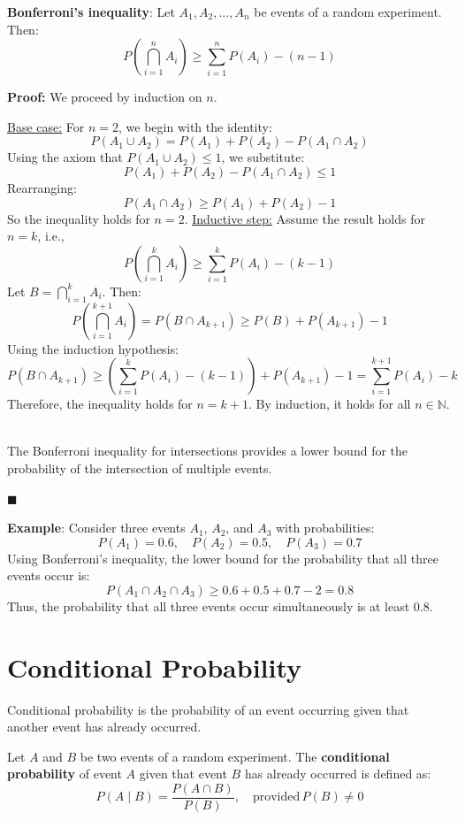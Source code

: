\documentclass[twoside]{book}
\begin{document}
\begin{textbox}
\textbf{Bonferroni's inequality}: Let \( A_1, A_2, \ldots, A_n \) be events of a random experiment. Then:
\[
P\left( \bigcap_{i=1}^n A_i \right) \geq \sum_{i=1}^n P(A_i) - (n - 1)
\]
\end{textbox}
\textbf{Proof:} We proceed by induction on \( n \).

\underline{Base case:} For \( n = 2 \),
we begin with the identity:
\[
P(A_1 \cup A_2) = P(A_1) + P(A_2) - P(A_1 \cap A_2)
\]
Using the axiom that \( P(A_1 \cup A_2) \leq 1 \), we substitute:
\[
P(A_1) + P(A_2) - P(A_1 \cap A_2) \leq 1
\]
Rearranging:
\[
 P(A_1 \cap A_2) \geq P(A_1) + P(A_2) - 1
\]
So the inequality holds for $n = 2$.
\underline{Inductive step:} Assume the result holds for \( n = k \), i.e.,
\[
P\left( \bigcap_{i=1}^{k} A_i \right) \geq \sum_{i=1}^{k} P(A_i) - (k - 1)
\]
Let \( B = \bigcap_{i=1}^{k} A_i \). Then:
\[
P\left( \bigcap_{i=1}^{k+1} A_i \right) = P(B \cap A_{k+1}) \geq P(B) + P(A_{k+1}) - 1
\]
Using the induction hypothesis:
\[
P(B \cap A_{k+1}) \geq \left( \sum_{i=1}^{k} P(A_i) - (k - 1) \right) + P(A_{k+1}) - 1 = \sum_{i=1}^{k+1} P(A_i) - k
\]
Therefore, the inequality holds for \( n = k + 1 \). By induction, it holds for all \( n \in \mathbb{N} \). \

The Bonferroni inequality for intersections provides a lower bound for the probability of the intersection of multiple events.

\hfill\(\blacksquare\)

\textbf{Example}: Consider three events \( A_1 \), \( A_2 \), and \( A_3 \) with probabilities:
\[
P(A_1) = 0.6, \quad P(A_2) = 0.5, \quad P(A_3) = 0.7
\]
Using Bonferroni’s inequality, the lower bound for the probability that all three events occur is:
\[
P(A_1 \cap A_2 \cap A_3) \geq 0.6 + 0.5 + 0.7 - 2 = 0.8
\]
Thus, the probability that all three events occur simultaneously is at least \( 0.8 \).

\section{Conditional Probability}

Conditional probability is the probability of an event occurring given that another event has already occurred.

\begin{textbox}
    Let $A$ and $B$ be two events of a random experiment. The \textbf{conditional probability} of event \( A \) given that event \( B \) has already occurred is defined as:
\[
P(A \mid B) = \frac{P(A \cap B)}{P(B)}, \quad \text{provided} \, P(B) \neq 0
\]
\end{textbox}
\end{document}
